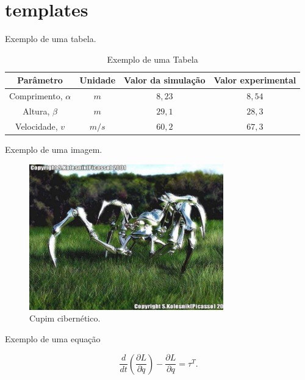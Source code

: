 \section{templates}

Exemplo de uma tabela.

\begin{table}[ht]
\caption{Exemplo de uma Tabela}
\label{minhatab}

\center
\begin{tabular}{cccc}
  \hline
	Parâmetro & Unidade & Valor da simulação & Valor experimental   \\
	\hline
  Comprimento, $\alpha$ & $m$ &  $8,23$  & $8,54$ \\
  Altura, $\beta$ & $m$     &  $29,1$ & $28,3$\\
	Velocidade, $v$ & $m/s$  &  $60,2$ & $67,3$\\
	\hline
\end{tabular}
\end{table}

Exemplo de uma imagem.

\begin{figure}[ht]
\centering
\includegraphics[width=0.75\textwidth]{Cap2/spiderrobot}
\caption{Cupim cibernético.}\label{fig:cupim}
\end{figure}


Exemplo de uma equação

\begin{equation} \label{eq:lagr1}
\frac{d}{dt}(\frac{\partial L}{\partial \dot{q}})-\frac{\partial L}{\partial q}=\tau^{T}.
\end{equation}

